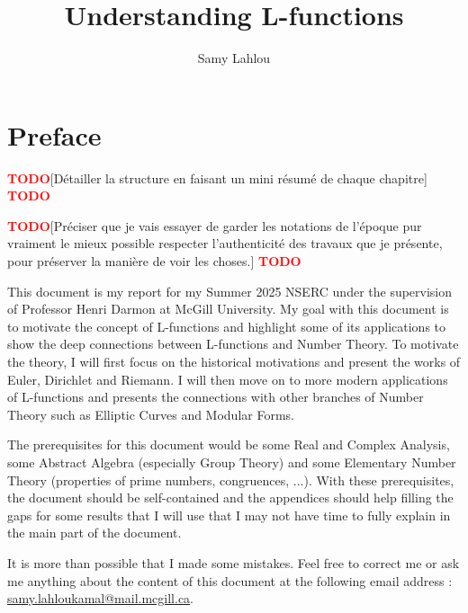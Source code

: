 \documentclass[oneside]{book}
\title{\Huge Understanding L-functions}
\author{Samy Lahlou}
\date{}
\theoremstyle{plain}
\theoremstyle{definition}
\newcommand{\td}{\textcolor{red}{\textbf{TODO}}}
\begin{document}
\maketitle 

\frontmatter

\chapter*{Preface}

\td [Détailler la structure en faisant un mini résumé de chaque chapitre] \td 

\td [Préciser que je vais essayer de garder les notations de l'époque pur vraiment le mieux possible respecter l'authenticité des travaux que je présente, pour préserver la manière de voir les choses.] \td 

This document is my report for my Summer 2025 NSERC under the supervision of Professor Henri Darmon at McGill University. My goal with this document is to motivate the concept of L-functions and highlight some of its applications to show the deep connections between L-functions and Number Theory. To motivate the theory, I will first focus on the historical motivations and present the works of Euler, Dirichlet and Riemann. I will then move on to more modern applications of L-functions and presents the connections with other branches of Number Theory such as Elliptic Curves and Modular Forms.

The prerequisites for this document would be some Real and Complex Analysis, some Abstract Algebra (especially Group Theory) and some Elementary Number Theory (properties of prime numbers, congruences, ...). With these prerequisites, the document should be self-contained and the appendices should help filling the gaps for some results that I will use that I may not have time to fully explain in the main part of the document.

It is more than possible that I made some mistakes. Feel free to correct me or ask me anything about the content of this document at the following email address : \href{mailto:samy.lahloukamal@mail.mcgill.ca}{samy.lahloukamal@mail.mcgill.ca}.

\tableofcontents

\newpage

\mainmatter











\appendix



\newpage


\end{document}
